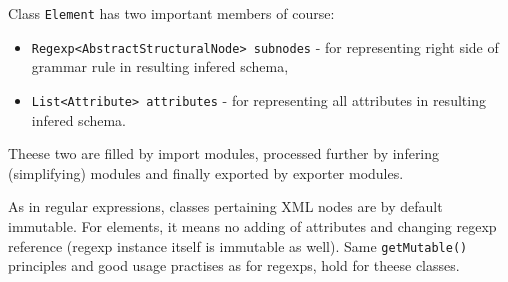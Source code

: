 \documentclass[a4paper,10pt,oneside]{article}
\newcommand{\code}[1]{\texttt{#1}}
\begin{document}
Class \code{Element} has two important members of course:
\begin{itemize}
	\item \code{Regexp<AbstractStructuralNode> subnodes} - for representing right side of grammar rule in resulting infered schema,
	\item \code{List<Attribute> attributes} - for representing all attributes in resulting infered schema.
\end{itemize}
Theese two are filled by import modules, processed further by infering (simplifying) modules and finally exported by exporter modules.

As in regular expressions, classes pertaining XML nodes are by default immutable.
For elements, it means no adding of attributes and changing regexp reference (regexp instance itself is immutable as well).
Same \code{getMutable()} principles and good usage practises as for regexps, hold for theese classes.
\end{document}
